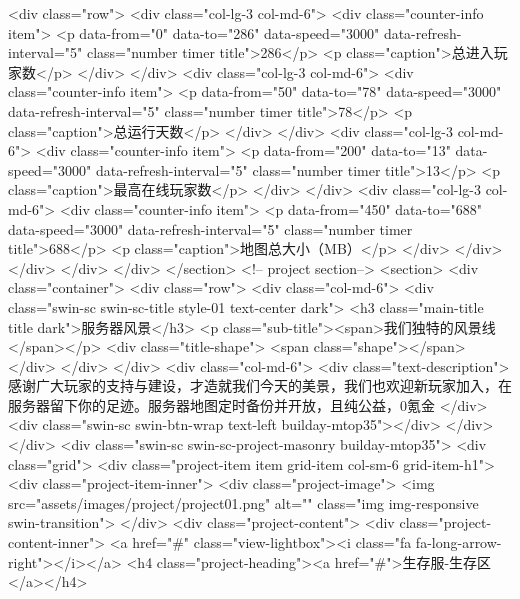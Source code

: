        <div class="row"> 
        <div class="col-lg-3 col-md-6"> 
         <div class="counter-info item"> 
          <p data-from="0" data-to="286" data-speed="3000" data-refresh-interval="5" class="number timer title">286</p> 
          <p class="caption">总进入玩家数</p> 
         </div> 
        </div> 
        <div class="col-lg-3 col-md-6"> 
         <div class="counter-info item"> 
          <p data-from="50" data-to="78" data-speed="3000" data-refresh-interval="5" class="number timer title">78</p> 
          <p class="caption">总运行天数</p> 
         </div> 
        </div> 
        <div class="col-lg-3 col-md-6"> 
         <div class="counter-info item"> 
          <p data-from="200" data-to="13" data-speed="3000" data-refresh-interval="5" class="number timer title">13</p> 
          <p class="caption">最高在线玩家数</p> 
         </div> 
        </div> 
        <div class="col-lg-3 col-md-6"> 
         <div class="counter-info item"> 
          <p data-from="450" data-to="688" data-speed="3000" data-refresh-interval="5" class="number timer title">688</p> 
          <p class="caption">地图总大小（MB）</p> 
         </div> 
        </div> 
       </div> 
      </div> 
     </div> 
    </section> 
    <!-- project section--> 
    <section> 
     <div class="container"> 
      <div class="row"> 
       <div class="col-md-6"> 
        <div class="swin-sc swin-sc-title style-01 text-center dark"> 
         <h3 class="main-title title dark">服务器风景</h3> 
         <p class="sub-title"><span>我们独特的风景线</span></p> 
         <div class="title-shape">
          <span class="shape"></span>
         </div> 
        </div> 
       </div> 
       <div class="col-md-6"> 
        <div class="text-description">
         感谢广大玩家的支持与建设，才造就我们今天的美景，我们也欢迎新玩家加入，在服务器留下你的足迹。服务器地图定时备份并开放，且纯公益，0氪金
        </div> 
        <div class="swin-sc swin-btn-wrap text-left builday-mtop35"></div> 
       </div> 
      </div> 
      <div class="swin-sc swin-sc-project-masonry builday-mtop35"> 
       <div class="grid"> 
        <div class="project-item item grid-item col-sm-6 grid-item-h1"> 
         <div class="project-item-inner"> 
          <div class="project-image">
           <img src="assets/images/project/project01.png" alt="" class="img img-responsive swin-transition">
          </div> 
          <div class="project-content"> 
           <div class="project-content-inner">
            <a href="#" class="view-lightbox"><i class="fa fa-long-arrow-right"></i></a> 
            <h4 class="project-heading"><a href="#">生存服-生存区</a></h4> 

